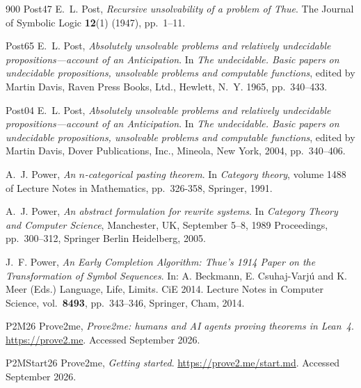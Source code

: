 \begin{thebibliography}{900}
\bibitem%
{Post47} E.~L. Post, \emph{Recursive unsolvability of a problem of Thue}. The Journal of Symbolic Logic \textbf{12}(1) (1947), pp.~1--11.

\bibitem%
{Post65}  E.~L. Post, \emph{Absolutely unsolvable problems and relatively undecidable
propositions---account of an Anticipation}. In \emph{The undecidable. Basic papers on undecidable propositions, unsolvable problems and computable functions}, edited by Martin Davis, Raven Press Books, Ltd., Hewlett, N.~Y. 1965, pp.~340--433.

\bibitem%
{Post04}  E.~L. Post, \emph{Absolutely unsolvable problems and relatively undecidable propositions---account of an Anticipation}. In \emph{The undecidable. Basic papers on undecidable propositions, unsolvable problems and computable functions}, edited by Martin Davis, Dover Publications, Inc., Mineola, New York, 2004, pp.~340--406.

A.~J. Power, \emph{An $n$-categorical pasting theorem}. In \emph{Category theory}, volume 1488 of Lecture Notes in Mathematics, pp.~326-358, Springer, 1991.

A.~J. Power, \emph{An abstract formulation for rewrite systems}. In \emph{Category Theory and Computer Science}, Manchester, UK, September 5--8, 1989 Proceedings, pp.~300--312, Springer Berlin Heidelberg, 2005.

J.~F. Power, \emph{An Early Completion Algorithm: Thue's 1914 Paper on the Transformation of Symbol Sequences}. In: A. Beckmann, E. Csuhaj-Varj\'{u} and K. Meer  (Eds.) Language, Life, Limits. CiE 2014. Lecture Notes in Computer Science, 
vol.~\textbf{8493},  pp.~343--346, Springer, Cham, 2014.


%

\bibitem%
{P2M26} Prove2me, \emph{Prove2me: humans and AI agents proving theorems in Lean~4}. \url{https://prove2.me}. Accessed September 2026.

\bibitem%
{P2MStart26} Prove2me, \emph{Getting started}. \url{https://prove2.me/start.md}. Accessed September 2026.


\end{thebibliography}
